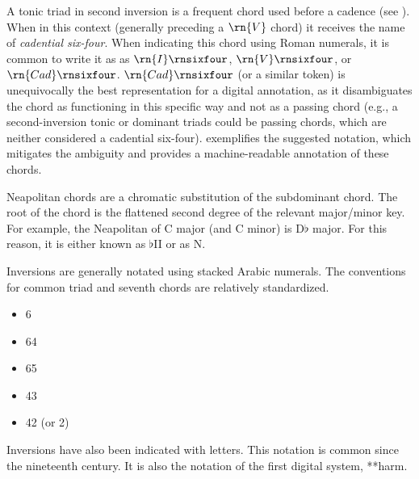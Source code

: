 A tonic triad in second inversion is a frequent chord used
before a cadence (see ). When in
this context (generally preceding a $\rn{V}$ chord) it
receives the name of \emph{cadential six-four}. When
indicating this chord using Roman numerals, it is common to
write it as as $\rn{I}\rnsixfour$, $\rn{V}\rnsixfour$, or
$\rn{Cad}\rnsixfour$. $\rn{Cad}\rnsixfour$ (or a similar
token) is unequivocally the best representation for a
digital annotation, as it disambiguates the chord as
functioning in this specific way and not as a passing chord
(e.g., a second-inversion tonic or dominant triads could be
passing chords, which are neither considered a cadential
six-four).  exemplifies the suggested notation, which mitigates the ambiguity and provides a machine-readable annotation of these chords.

Neapolitan chords are a chromatic substitution of the
subdominant chord. The root of the chord is the flattened
second degree of the relevant major/minor key. For example,
the Neapolitan of C major (and C minor) is D$\flat$ major.
For this reason, it is either known as $\flat$II or as N.

Inversions are generally notated using stacked Arabic
numerals. The conventions for common triad and seventh
chords are relatively standardized.

\begin{itemize}
    \item 6
    \item 64
    \item 65
    \item 43
    \item 42 (or 2)
\end{itemize}

Inversions have also been indicated with letters. This
notation is common since the nineteenth century. It is also
the notation of the first digital system, **harm.
